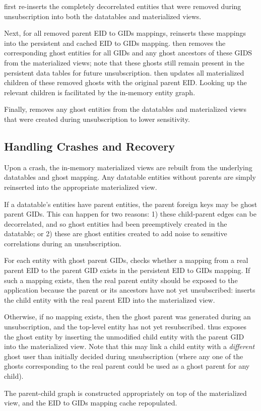 \name first re-inserts the completely decorrelated entities that were removed during unsubscription
into both the datatables and materialized views. 

Next, for all removed parent EID to GIDs mappings, \name reinserts these mappings into the
persistent and cached EID to GIDs mapping.
\name then removes the corresponding ghost entities for all GIDs and any ghost ancestors of these
GIDS from the materialized views; note that these ghosts still remain present in the
persistent data tables for future unsubscription.
\name then updates all materialized children of these removed ghosts with the original parent EID. Looking up the relevant
children is facilitated by the in-memory entity graph. 

Finally, \name removes any
ghost entities from the datatables and materialized views that were created during unsubscription to
lower sensitivity.

\subsection{Handling Crashes and Recovery}
Upon a crash, the in-memory materialized views are rebuilt from the underlying datatables and ghost
mapping. Any datatable entities without parents are simply reinserted into the appropriate
materialized view. 

If a datatable's entities have parent entities, the parent foreign keys may be ghost parent GIDs. 
This can happen for two reasons: 1) these child-parent edges can be decorrelated, and so ghost
entities had been preemptively created in the datatable; or 2) these are ghost entities created to
add noise to sensitive correlations during an unsubscription. 

For each entity with ghost parent GIDs, \name checks whether a mapping
from a real parent EID to the parent GID exists in the persistent EID to GIDs mapping. 
If such a mapping exists, then the real parent entity should be exposed to the application because
the parent or its ancestors have not yet unsubscribed: \name inserts the child entity with the real parent
EID into the materialized view.

Otherwise, if no mapping exists, then the ghost parent was generated during an unsubscription, and
the top-level entity has not yet resubscribed. \name thus exposes the ghost entity by inserting the
unmodified child entity with the parent GID into the materialized view.
Note that this may link a child entity with a \emph{different} ghost user than initially decided
during unsubscription (where any one of the ghosts corresponding to the real parent could be used as
a ghost parent for any child). 

The parent-child graph is constructed appropriately on top of the materialized view, and the EID to
GIDs mapping cache repopulated.

\fi
